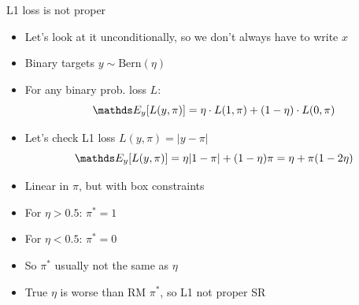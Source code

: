 \documentclass[11pt,compress,t,notes=noshow, xcolor=table]{beamer}
\begin{document}
\begin{vbframe}{L1 loss is not proper}

\begin{itemize}

\item Let's look at it unconditionally, so we don't always have to write $x$
    
\item Binary targets $y \sim \text{Bern}(\eta)$ %


\item For any binary prob. loss $L$:
$$\E_{y}[L(y, \pi)]=\eta \cdot L(1, \pi) + (1-\eta) \cdot L(0, \pi)$$

\item Let's check L1 loss $L(y, \pi)=|y-\pi|$
$$\E_y[L(y, \pi)]=\eta |1-\pi| + (1-\eta) \pi = \eta+\pi(1-2\eta)$$

\item Linear in $\pi$, but with box constraints


\item For $\eta > 0.5$: $\pi^{\ast} =1$ 

\item For $\eta < 0.5$: $\pi^{\ast} = 0$

\item So $\pi^{\ast}$ usually not the same as $\eta$

\item True $\eta$ is worse than RM $\pi^{\ast}$, so L1 not proper SR


\end{itemize}

\end{vbframe}
\end{document}
